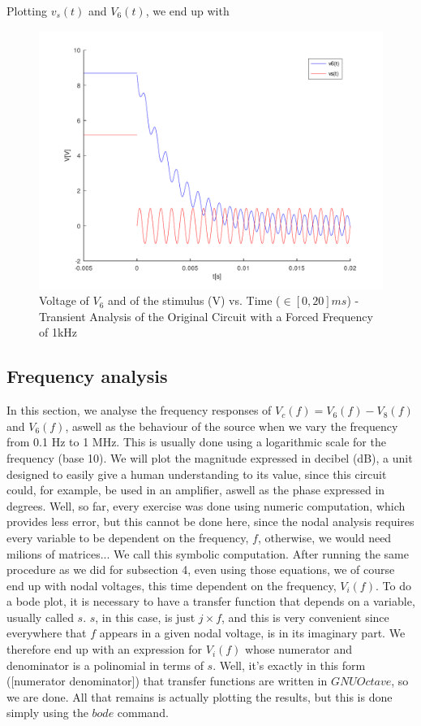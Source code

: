 Plotting $v_s(t)$ and $V_6(t)$, we end up with

\begin{figure}[h] \centering
\includegraphics[width=0.6\linewidth]{../mat/t2-t5.pdf}
\caption{Voltage of $V_6$ and of the stimulus (V) vs. Time ($\in [0, 20]ms$) - Transient Analysis of the Original Circuit with a Forced Frequency of 1kHz}
\label{cfergter}
\end{figure}



\newpage

\subsection{Frequency analysis}

In this section, we analyse the frequency responses of $V_c(f) = V_6(f) - V_8(f)$ and $V_6(f)$, aswell as the behaviour of the source when we vary the frequency from 0.1 Hz to 1 MHz. This is usually done using a logarithmic scale for the frequency (base 10). We will plot the magnitude expressed in decibel (dB), a unit designed to easily give a human understanding to its value, since this circuit could, for example, be used in an amplifier, aswell as the phase expressed in degrees. Well, so far, every exercise was done using numeric computation, which provides less error, but this cannot be done here, since the nodal analysis requires every variable to be dependent on the frequency, $f$, otherwise, we would need milions of matrices... We call this symbolic computation. After running the same procedure as we did for subsection 4, even using those equations, we of course end up with nodal voltages, this time dependent on the frequency, $V_i(f)$. To do a bode plot, it is necessary to have a transfer function that depends on a variable, usually called $s$. $s$, in this case, is just $j \times f$, and this is very convenient since everywhere that $f$ appears in a given nodal voltage, is in its imaginary part. We therefore end up with an expression for $V_i(f)$ whose numerator and denominator is a polinomial in terms of $s$. Well, it's exactly in this form ([numerator denominator]) that transfer functions are written in $GNUOctave$, so we are done. All that remains is actually plotting the results, but this is done simply using the $bode$ command.

